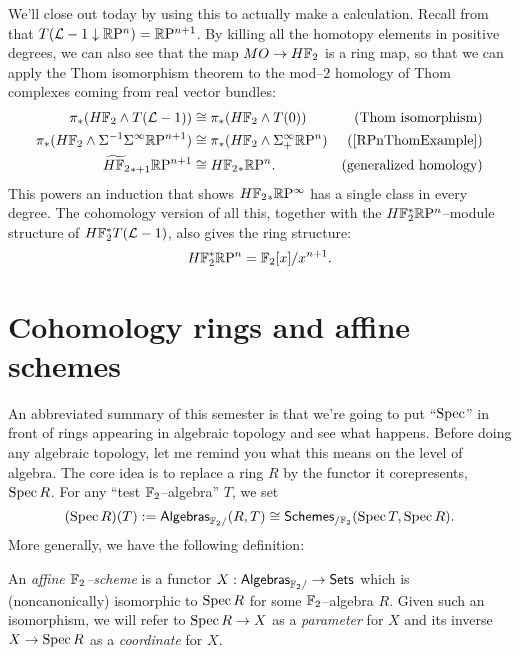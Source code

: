\begin{example}
We'll close out today by using this to actually make a calculation. Recall from  that $T(\mathcal{L} - 1 \downarrow \mathbb R\mathrm P^n) = \mathbb R\mathrm P^{n+1}$.  By killing all the homotopy elements in positive degrees, we can also see that the map $MO \to H\mathbb F_2$ is a ring map, so that we can apply the Thom isomorphism theorem to the mod--$2$ homology of Thom complexes coming from real vector bundles:
\begin{align*}
\pi_* (H\F_2 \sm T(\L - 1)) & \cong \pi_* (H\F_2 \sm T(0)) & \text{(Thom isomorphism)} \\
\pi_* (H\F_2 \sm \Susp^{-1} \Susp^\infty \RP^{n+1}) & \cong \pi_* (H\F_2 \sm \Susp^\infty_+ \RP^n) & \text{(\Cref{RPnThomExample})} \\
\widetilde{H\F_2}_{*+1} \RP^{n+1} & \cong H\F_2{}_* \RP^n. & \text{(generalized homology)}
\end{align*}
This powers an induction that shows $H\mathbb F_2{}_* \mathbb R\mathrm P^\infty$ has a single class in every degree.    The cohomology version of all this, together with the $H\mathbb F_2^* \mathbb R\mathrm P^n$--module structure of $H\mathbb F_2^* T(\mathcal{L}-1)$, also gives the ring structure: \[H\mathbb F_2^* \mathbb R\mathrm P^n = \mathbb F_2[x] / x^{n+1}.\] 
\end{example}






\section{Cohomology rings and affine schemes}

An abbreviated summary of this semester is that we're going to put ``$\operatorname{Spec}$'' in front of rings appearing in algebraic topology and see what happens.  Before doing any algebraic topology, let me remind you what this means on the level of algebra.  The core idea is to replace a ring $R$ by the functor it corepresents, $\operatorname{Spec} R$.  For any ``test $\mathbb F_2$--algebra'' $T$, we set \[(\operatorname{Spec} R)(T) := \mathsf{Algebras}_{\mathbb F_2/}(R, T) \cong \mathsf{Schemes}_{/\mathbb F_2}(\operatorname{Spec} T, \operatorname{Spec} R).\]  More generally, we have the following definition:
\begin{definition}
An \textit{affine $\mathbb F_2$--scheme} is a functor $X: \mathsf{Algebras}_{\mathbb F_2/} \to \mathsf{Sets}$ which is (noncanonically) isomorphic to $\operatorname{Spec} R$ for some $\mathbb F_2$--algebra $R$.  Given such an isomorphism, we will refer to $\operatorname{Spec} R \to X$ as a \textit{parameter} for $X$ and its inverse $X \to \operatorname{Spec} R$ as a \textit{coordinate} for $X$.
\end{definition}

